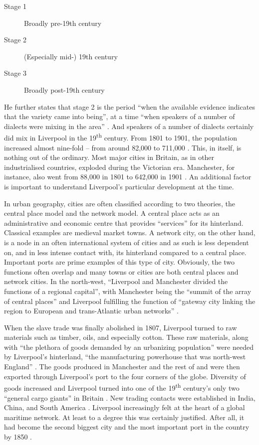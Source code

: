 	\begin{description}
		\item[Stage 1] Broadly pre-19th century
		\item[Stage 2] (Especially mid-) 19th century
		\item[Stage 3] Broadly post-19th century
	\end{description}

He further states that stage 2 is the period ``when the available evidence indicates that the variety came into being'', at a time ``when speakers of a number of dialects were mixing in the area'' \parencite[106--107]{honeybone2007}.
And speakers of a number of dialects certainly did mix in Liverpool in the 19\textsuperscript{th} century.
From 1801 to 1901, the population increased almost nine-fold -- from around 82,000 to 711,000 \parencite{gbhistgis}.
This, in itself, is nothing out of the ordinary.
Most major cities in Britain, as in other industrialised countries, exploded during the Victorian era.
Manchester, for instance, also went from 88,000 in 1801 to 642,000 in 1901 \parencite{gbhistgis}.
An additional factor is important to understand Liverpool's particular development at the time.

In urban geography, cities are often classified according to two theories, the central place model and the network model.
A central place acts as an administrative and economic centre that provides ``services'' for its hinterland. Classical examples are medieval market towns.
A network city, on the other hand, is a node in an often international system of cities and as such is less dependent on, and in less intense contact with, its hinterland compared to a central place.
Important ports are prime examples of this type of city.
Obviously, the two functions often overlap and many towns or cities are both central places and network cities.
In the north-west, ``Liverpool and Manchester divided the functions of a regional capital'', with Manchester being the ``summit of the array of central places'' and Liverpool fulfilling the function of ``gateway city linking the region to European and trans-Atlantic urban networks'' \citep[188--189]{hohenberglees1985}.

When the slave trade was finally abolished in 1807, Liverpool turned to raw materials such as timber, oils, and especially cotton.
These raw materials, along with ``the plethora of goods demanded by an urbanizing population'' were needed by Liverpool's hinterland, ``the manufacturing powerhouse that was north-west England'' \parencite[258]{milne2006}.
The goods produced in Manchester and the rest of  and  were then exported through Liverpool's port to the four corners of the globe.
Diversity of goods increased and Liverpool turned into one of the 19\textsuperscript{th} century's only two ``general cargo giants'' in Britain \parencite[259]{milne2006}.
New trading contacts were established in India, China, and South America .
Liverpool increasingly felt at the heart of a global maritime network.
At least to a degree this was certainly justified.
After all, it had become the second biggest city and the most important port in the country by 1850 \citep[cf.][113--114]{honeybone2007}.

